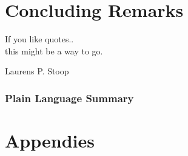 \documentclass[]{dissertation}
\begin{document}
\setcounter{colorcounter}{3}
\part[Concluding remarks]{Concluding Remarks}
\label{part:conclusion}


\epigraph{
       If you like quotes.. \\ this might be a way to go.
}{Laurens P. Stoop}

\section*{Plain Language Summary}
\lipsum[1337]


\newpage
\chaptoc








% 





\cleardoublepage






\appendix

\setcounter{colorcounter}{4}
\part[Appendices]{Appendies}
\label{part:appendix}

\chaptoc
\end{document}
